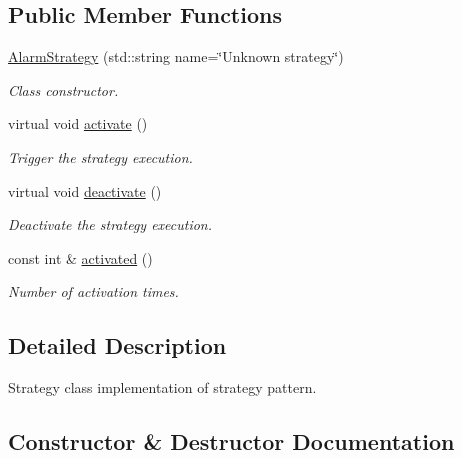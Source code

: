 \subsection*{Public Member Functions}
\begin{DoxyCompactItemize}
\item 
\hyperlink{classAlarmStrategy_afe181296dbc2f3a87ccc50f9d92349fd}{Alarm\+Strategy} (std\+::string name=\char`\"{}Unknown strategy\char`\"{})
\begin{DoxyCompactList}\small\item\em Class constructor. \end{DoxyCompactList}\item 
virtual void \hyperlink{classAlarmStrategy_a6aedaab2ebe535c76af8d3e07dcf7f1e}{activate} ()\hypertarget{classAlarmStrategy_a6aedaab2ebe535c76af8d3e07dcf7f1e}{}\label{classAlarmStrategy_a6aedaab2ebe535c76af8d3e07dcf7f1e}

\begin{DoxyCompactList}\small\item\em Trigger the strategy execution. \end{DoxyCompactList}\item 
virtual void \hyperlink{classAlarmStrategy_ad04a9ef585215c424adea86447d7c994}{deactivate} ()\hypertarget{classAlarmStrategy_ad04a9ef585215c424adea86447d7c994}{}\label{classAlarmStrategy_ad04a9ef585215c424adea86447d7c994}

\begin{DoxyCompactList}\small\item\em Deactivate the strategy execution. \end{DoxyCompactList}\item 
const int \& \hyperlink{classAlarmStrategy_adabc0b4f8df5b63b142114d3391ffb7b}{activated} ()
\begin{DoxyCompactList}\small\item\em Number of activation times. \end{DoxyCompactList}\end{DoxyCompactItemize}


\subsection{Detailed Description}
Strategy class implementation of strategy pattern. 

\subsection{Constructor \& Destructor Documentation}
